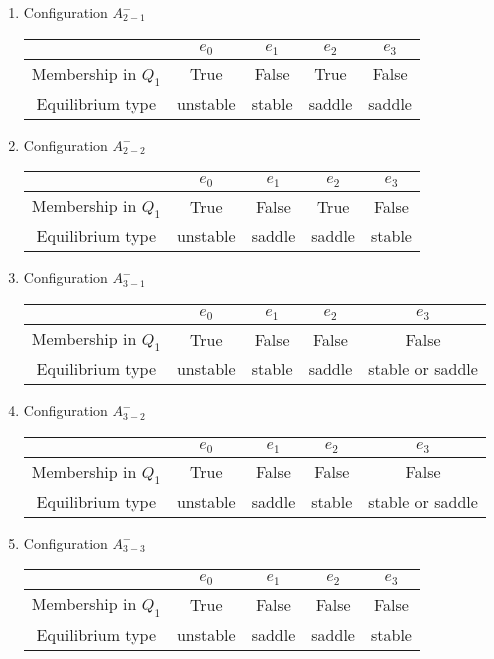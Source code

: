 \documentclass{amsart}
\theoremstyle{definition}
\numberwithin{equation}{section}
\begin{document}
\begin{enumerate}
 \item Configuration $A_{2-1}^-$

 \medskip
 \begin{tabular}[hc]{|c|c|c|c|c|}
\hline
& $e_0$ & $e_1$ & $e_2$ & $e_3$ \\
\hline
Membership in $Q_1$ & True & False & True &False\\
\hline
Equilibrium type & unstable & stable & saddle & saddle \\
\hline
\end{tabular}
\medskip


 \item Configuration $A_{2-2}^-$

 \medskip
 \begin{tabular}[hc]{|c|c|c|c|c|}
\hline
& $e_0$ & $e_1$ & $e_2$ & $e_3$ \\
\hline
Membership in $Q_1$ & True & False & True & False\\
\hline
Equilibrium type & unstable & saddle & saddle & stable \\
\hline
\end{tabular}
\medskip


\item Configuration $A_{3-1}^-$

 \medskip
 \begin{tabular}[hc]{|c|c|c|c|c|}
\hline
& $e_0$ & $e_1$ & $e_2$ & $e_3$ \\
\hline
Membership in $Q_1$ & True & False & False & False\\
\hline
Equilibrium type & unstable & stable & saddle & stable or saddle \\
\hline
\end{tabular}
\medskip

\item Configuration $A_{3-2}^-$

 \medskip
 \begin{tabular}[hc]{|c|c|c|c|c|}
\hline
& $e_0$ & $e_1$ & $e_2$ & $e_3$ \\
\hline
Membership in $Q_1$ & True & False & False & False\\
\hline
Equilibrium type & unstable & saddle & stable & stable or saddle \\
\hline
\end{tabular}
\medskip


 \item Configuration $A_{3-3}^-$

 \medskip
 \begin{tabular}[hc]{|c|c|c|c|c|}
\hline
& $e_0$ & $e_1$ & $e_2$ & $e_3$ \\
\hline
Membership in $Q_1$ & True & False & False & False\\
\hline
Equilibrium type & unstable & saddle & saddle & stable \\
\hline
\end{tabular}
\medskip



\end{enumerate}
\end{document}
